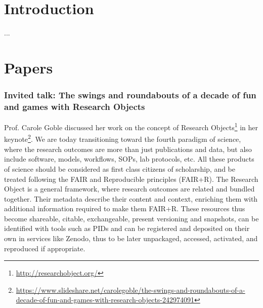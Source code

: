\documentclass[sigconf, nonacm]{acmart}
\begin{document}


\maketitle

\section{Introduction}
...

\section{Papers}
\subsubsection*{Invited talk: The swings and roundabouts of a decade of fun and games with Research Objects} Prof. Carole Goble discussed her work on the concept of Research Objects\footnote{\url{http://researchobject.org/}}\cite{bechhofer2013linked} in her keynote\footnote{\url{https://www.slideshare.net/carolegoble/the-swings-and-roundabouts-of-a-decade-of-fun-and-games-with-research-objects-242974091}}. We are today transitioning toward the fourth paradigm of science, where the research outcomes are more than just publications and data, but also include software, models, workflows, SOPs, lab protocols, etc. All these products of science should be considered as first class citizens of scholarship, and be treated following the FAIR and Reproducible principles (FAIR+R). 
The Research Object is a general framework, where research outcomes are related and bundled together. Their metadata describe their content and context, enriching them with additional information required to make them FAIR+R. These resources thus become shareable, citable, exchangeable, present versioning and snapshots, can be identified with tools such as PIDs and can be registered and deposited on their own in services like Zenodo, thus to be later unpackaged, accessed, activated, and reproduced if appropriate. 
\end{document}
